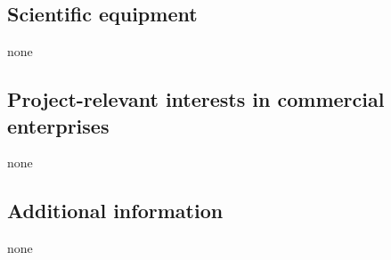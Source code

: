 \documentclass[10pt,fleqn,twoside]{article}
\begin{document}

\subsection{Scientific equipment}

none

\subsection{Project-relevant interests in commercial enterprises}

none


\subsection{Additional information}

none
\end{document}
